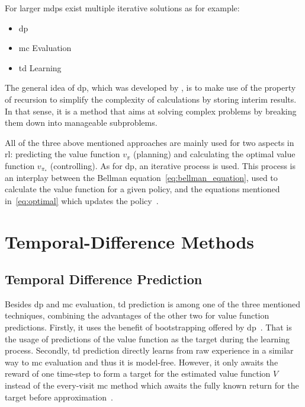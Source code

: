 \documentclass[draft,final]{vutinfth} %
\newcommand{\p}[1]{see p. #1}
\begin{document}
    For larger \glspl{mdp} exist multiple iterative solutions as for example:
    \begin{itemize}
        \item \gls{dp}
        \item \gls{mc} Evaluation
        \item \gls{td} Learning
    \end{itemize}

    The general idea of \gls{dp}, which was developed by \citeauthor{bellman_theory_1954}, is to make use of the property of recursion to simplify the complexity of calculations by storing interim results.
    In that sense, it is a method that aims at solving complex problems by breaking them down into manageable subproblems.

    All of the three above mentioned approaches are mainly used for two aspects in \gls{rl}: predicting the value function $v_\pi$ (planning) and calculating the optimal value function $v_{\pi_*}$ (controlling).
    As for \gls{dp}, an iterative process is used.
    This process is an interplay between the Bellman equation~\eqref{eq:bellman_equation}, used to calculate the value function for a given policy, and the equations mentioned in~\eqref{eq:optimal} which updates the policy~.


    \section{Temporal-Difference Methods}


    \subsection{Temporal Difference Prediction}
    Besides \gls{dp} and \gls{mc} evaluation, \gls{td} prediction is among one of the three mentioned techniques, combining the advantages of the other two for value function predictions.
    Firstly, it uses the benefit of bootstrapping offered by \gls{dp}~\citep[\p{18}]{szepesvari_algorithms_2010}.
    That is the usage of predictions of the value function as the target during the learning process.
    Secondly, \gls{td} prediction directly learns from raw experience in a similar way to \gls{mc} evaluation and thus it is model-free.
    However, it only awaits the reward of one time-step to form a target for the estimated value function $V$ instead of the every-visit \gls{mc} method which awaits the fully known return for the target before approximation~\citep[\p{120}]{sutton_reinforcement_2018}.
\end{document}
